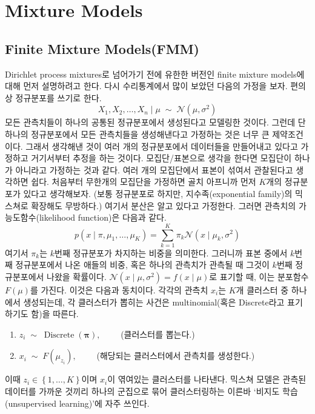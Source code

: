 \documentclass[a4paper, 10pt]{book}
\newcommand{\bs}{\boldsymbol}
\newcommand{\opn}{\operatorname}
\begin{document}
  \chapter{Mixture Models}
  \section{Finite Mixture Models(FMM)}
    Dirichlet process mixtures로 넘어가기 전에 유한한 버전인 finite mixture models에 대해 먼저 설명하려고 한다. 다시 수리통계에서 많이 보았던 다음의 가정을 보자. 편의상 정규분포를 쓰기로 한다.
    $$
    X_{1},X_{2},\ldots , X_{n}\;|\;\mu\;\sim\; \mathcal{N}\left(\mu, \sigma^{2}\right)
    $$
    모든 관측치들이 하나의 공통된 정규분포에서 생성된다고 모델링한 것이다. 그런데 단 하나의 정규분포에서 모든 관측치들을 생성해낸다고 가정하는 것은 너무 큰 제약조건이다. 그래서 생각해낸 것이 여러 개의 정규분포에서 데이터들을 만들어내고 있다고 가정하고 거기서부터 추정을 하는 것이다. 모집단/표본으로 생각을 한다면 모집단이 하나가 아니라고 가정하는 것과 같다. 여러 개의 모집단에서 표본이 섞여서 관찰된다고 생각하면 쉽다. 처음부터 무한개의 모집단을 가정하면 골치 아프니까 먼저 $K$개의 정규분포가 있다고 생각해보자. (보통 정규분포로 하지만, 지수족(exponential family)의 믹스쳐로 확장해도 무방하다.) 여기서 분산은 알고 있다고 가정한다. 그러면 관측치의 가능도함수(likelihood function)은 다음과 같다.
    \begin{equation}
    p\left(x\;|\;\pi,\mu_{1},\ldots , \mu_{K}\right) = \sum_{k=1}^{K}\pi_{k}\mathcal{N}\left(x\;|\;\mu_{k},\sigma^{2}\right)
    \end{equation}
    여기서 $\pi_{k}$는 $k$번째 정규분포가 차지하는 비중을 의미한다. 그러니까 표본 중에서 $k$번째 정규분포에서 나온 애들의 비중, 혹은 하나의 관측치가 관측될 때 그것이 $k$번째 정규분포에서 나왔을 확률이다. $\mathcal{N}\left(x\;|\;\mu,\sigma^{2}\right)=f\left(x\;|\;\mu\right)$로 표기할 때, 이는 분포함수 $F\left(\mu\right)$를 가진다. 이것은 다음과 동치이다. 각각의 관측치 $x_{i}$는 $K$개 클러스터 중 하나에서 생성되는데, 각 클러스터가 뽑히는 사건은 multinomial(혹은 Discrete라고 표기하기도 함)을 따른다.
    \begin{enumerate}
      \item $z_{i}\;\sim\;\opn{Discrete}\left(\bs{\pi}\right), \qquad$ (클러스터를 뽑는다.)
      \item $x_{i}\;\sim\;F\left(\mu_{z_{i}}\right), \qquad$ (해당되는 클러스터에서 관측치를 생성한다.)
    \end{enumerate}
    
    이때 $z_{i}\in\left\{1,\ldots,K\right\}$이며 $x_{i}$이 엮여있는 클러스터를 나타낸다. 믹스쳐 모델은 관측된 데이터를 가까운 것끼리 하나의 군집으로 묶어 클러스터링하는 이른바 `비지도 학습(unsupervised learning)'에 자주 쓰인다. \par
\end{document}
